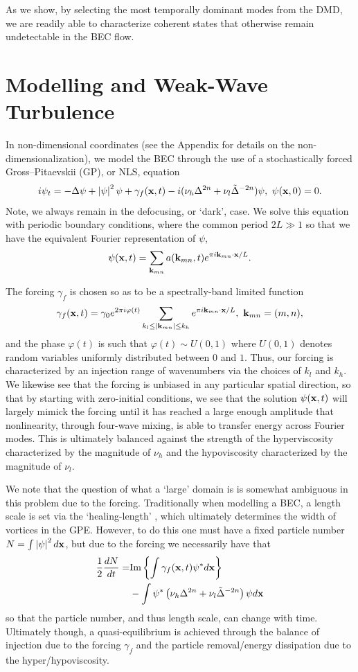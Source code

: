 \documentclass[a4paper,11pt]{article}
\begin{document}
As we show, by selecting the most temporally dominant modes from the DMD, we are readily able to characterize coherent states that otherwise remain undetectable in the BEC flow.  

\section*{Modelling and Weak-Wave Turbulence}

In non-dimensional coordinates (see the Appendix for details on the non-dimensionalization), we model the BEC through the use of a stochastically forced Gross--Pitaevskii (GP), or NLS, equation 
\[
i\psi_{t} = -\Delta \psi +  \left| \psi\right|^{2}\psi + \gamma_{f}({\bf x},t) - i(\nu_{h}\Delta^{2n}+\nu_{l}\tilde{\Delta}^{-2n})\psi, ~ \psi({\bf x},0)=0.
\]
Note, we always remain in the defocusing, or `dark', case.  We solve this equation with periodic boundary conditions, where the common period $2L \gg 1$ so that we have the equivalent Fourier representation of $\psi$,
\[
\psi({\bf x},t) = \sum_{{\bf k}_{mn}} a({\bf k}_{mn},t) e^{\pi i {\bf k}_{mn}\cdot {\bf x}/L}.
\]

The forcing $\gamma_{f}$ is chosen so as to be a spectrally-band limited function 
\[
\gamma_{f}({\bf x},t) = \gamma_{0}e^{2\pi i\varphi(t)}\sum_{k_{l}\leq |{\bf k}_{mn}| \leq k_{h}} e^{\pi i {\bf k}_{mn}\cdot {\bf x}/L}, ~ {\bf k}_{mn} = (m,n), 
\]
and the phase $\varphi(t)$ is such that $\varphi(t)  \sim U(0,1)$ where $U(0,1)$ denotes random variables uniformly distributed between $0$ and $1$.  Thus, our forcing is characterized by an injection range of wavenumbers via the choices of $k_{l}$ and $k_{h}$.  We likewise see that the forcing is unbiased in any particular spatial direction, so that by starting with zero-initial conditions, we see that the solution $\psi({\bf x},t)$ will largely mimick the forcing until it has reached a large enough amplitude that nonlinearity, through four-wave mixing, is able to transfer energy across Fourier modes.  This is ultimately balanced against the strength of the hyperviscosity characterized by the magnitude of $\nu_{h}$ and the hypoviscosity characterized by the magnitude of $\nu_{l}$.  

We note that the question of what a `large' domain is is somewhat ambiguous in this problem due to the forcing.  Traditionally when modelling a BEC, a length scale is set via the `healing-length' \cite{pethick}, which ultimately determines the width of vortices in the GPE.  However, to do this one must have a fixed particle number $N= \int \left|\psi\right|^{2}d{\bf x}$, but due to the forcing we necessarily have that 
\begin{align*}
\frac{1}{2}\frac{dN}{dt} = &  \mbox{Im}\left\{\int \gamma_{f}({\bf x},t) \psi^{\ast} d{\bf x} \right\}\\
& - \int \psi^{\ast}\left(\nu_{h}\Delta^{2n}+\nu_{l}\tilde{\Delta}^{-2n}\right)\psi d{\bf x}
\end{align*}
so that the particle number, and thus length scale, can change with time.  Ultimately though, a quasi-equilibrium is achieved through the balance of injection due to the forcing $\gamma_{f}$ and the particle removal/energy dissipation due to the hyper/hypoviscosity.  
\end{document}
